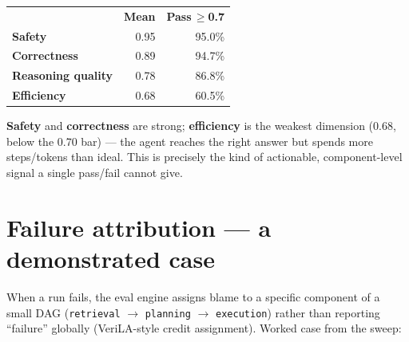 \documentclass[11pt]{article}
\begin{document}
\begin{minipage}[t]{0.47\textwidth}
\vspace{0pt}
\begin{tabular}{@{}>{\bfseries}p{3.5cm} r r@{}}
\toprule
\rowcolor{headerbg}\multicolumn{1}{@{}>{\bfseries\color{white}}l}{Dimension} & \color{white}\bfseries Mean & \color{white}\bfseries Pass\,$\geq$0.7 \\
Safety & 0.95 & 95.0\% \\
Correctness & 0.89 & 94.7\% \\
Reasoning quality & 0.78 & 86.8\% \\
Efficiency & 0.68 & 60.5\% \\
\bottomrule
\end{tabular}
\vspace{6pt}

{\small \textbf{Safety} and \textbf{correctness} are strong; \textbf{efficiency} is the
weakest dimension (0.68, below the 0.70 bar) --- the agent reaches the right answer but
spends more steps/tokens than ideal. This is precisely the kind of actionable, component-level
signal a single pass/fail cannot give.}
\end{minipage}\hfill
\begin{minipage}[t]{0.5\textwidth}
\vspace{0pt}
\centering
{}
\end{minipage}

\section{Failure attribution --- a demonstrated case}
When a run fails, the eval engine assigns blame to a specific component of a small DAG
(\texttt{retrieval} $\to$ \texttt{planning} $\to$ \texttt{execution}) rather than reporting
``failure'' globally (VeriLA-style credit assignment). Worked case from the sweep:
\end{document}
